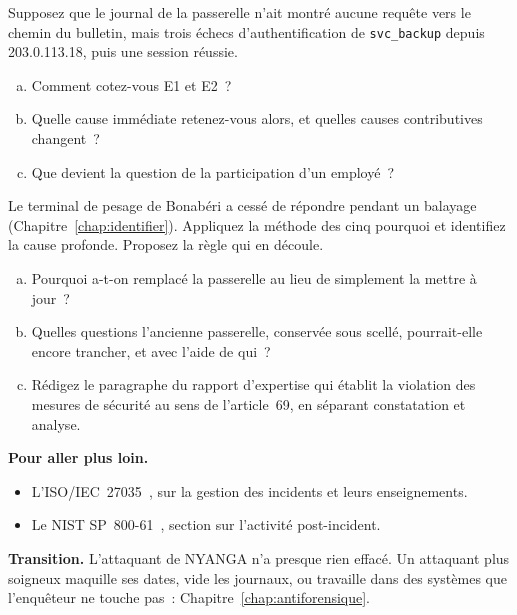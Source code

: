 \begin{boxexo}[title={\ding{45}\quad Exercice~12.2. Une autre signature \niveaumoyen}]
Supposez que le journal de la passerelle n'ait montré aucune requête vers le
chemin du bulletin, mais trois échecs d'authentification de
\texttt{svc\_backup} depuis 203.0.113.18, puis une session réussie.
\begin{enumerate}[(a)]
    \item Comment cotez-vous E1 et E2~?
    \item Quelle cause immédiate retenez-vous alors, et quelles causes
          contributives changent~?
    \item Que devient la question de la participation d'un employé~?
\end{enumerate}
\end{boxexo}

\begin{boxexo}[title={\ding{45}\quad Exercice~12.3. Les cinq pourquoi de SOLITRANS \niveaumoyen}]
Le terminal de pesage de Bonabéri a cessé de répondre pendant un balayage
(Chapitre~\ref{chap:identifier}). Appliquez la méthode des cinq pourquoi et
identifiez la cause profonde. Proposez la règle qui en découle.
\end{boxexo}

\begin{boxexo}[title={\ding{45}\quad Exercice~12.4. La passerelle sous scellé \niveauexpert}]
\begin{enumerate}[(a)]
    \item Pourquoi a-t-on remplacé la passerelle au lieu de simplement la
          mettre à jour~?
    \item Quelles questions l'ancienne passerelle, conservée sous scellé,
          pourrait-elle encore trancher, et avec l'aide de qui~?
    \item Rédigez le paragraphe du rapport d'expertise qui établit la
          violation des mesures de sécurité au sens de l'article~69, en
          séparant constatation et analyse.
\end{enumerate}
\end{boxexo}

\bigskip

\begin{boxinfo}
\textbf{Pour aller plus loin.}
\begin{itemize}
    \item L'ISO/IEC~27035~\cite{iso27035}, sur la gestion des incidents et
          leurs enseignements.
    \item Le NIST SP~800-61~\cite{nist80061r2}, section sur l'activité
          post-incident.
\end{itemize}
\end{boxinfo}

\begin{boxinfo}
\textbf{Transition.} L'attaquant de NYANGA n'a presque rien effacé. Un
attaquant plus soigneux maquille ses dates, vide les journaux, ou travaille
dans des systèmes que l'enquêteur ne touche pas~: Chapitre~\ref{chap:antiforensique}.
\end{boxinfo}
